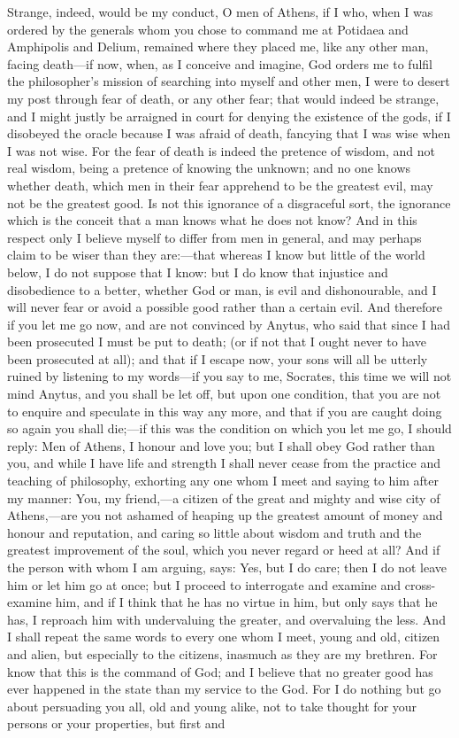 \documentclass[11pt,letter]{article}
\begin{document}
\par  Strange, indeed, would be my conduct, O men of Athens, if I who, when I was ordered by the generals whom you chose to command me at Potidaea and Amphipolis and Delium, remained where they placed me, like any other man, facing death—if now, when, as I conceive and imagine, God orders me to fulfil the philosopher’s mission of searching into myself and other men, I were to desert my post through fear of death, or any other fear; that would indeed be strange, and I might justly be arraigned in court for denying the existence of the gods, if I disobeyed the oracle because I was afraid of death, fancying that I was wise when I was not wise. For the fear of death is indeed the pretence of wisdom, and not real wisdom, being a pretence of knowing the unknown; and no one knows whether death, which men in their fear apprehend to be the greatest evil, may not be the greatest good. Is not this ignorance of a disgraceful sort, the ignorance which is the conceit that a man knows what he does not know? And in this respect only I believe myself to differ from men in general, and may perhaps claim to be wiser than they are:—that whereas I know but little of the world below, I do not suppose that I know: but I do know that injustice and disobedience to a better, whether God or man, is evil and dishonourable, and I will never fear or avoid a possible good rather than a certain evil. And therefore if you let me go now, and are not convinced by Anytus, who said that since I had been prosecuted I must be put to death; (or if not that I ought never to have been prosecuted at all); and that if I escape now, your sons will all be utterly ruined by listening to my words—if you say to me, Socrates, this time we will not mind Anytus, and you shall be let off, but upon one condition, that you are not to enquire and speculate in this way any more, and that if you are caught doing so again you shall die;—if this was the condition on which you let me go, I should reply: Men of Athens, I honour and love you; but I shall obey God rather than you, and while I have life and strength I shall never cease from the practice and teaching of philosophy, exhorting any one whom I meet and saying to him after my manner: You, my friend,—a citizen of the great and mighty and wise city of Athens,—are you not ashamed of heaping up the greatest amount of money and honour and reputation, and caring so little about wisdom and truth and the greatest improvement of the soul, which you never regard or heed at all? And if the person with whom I am arguing, says: Yes, but I do care; then I do not leave him or let him go at once; but I proceed to interrogate and examine and cross-examine him, and if I think that he has no virtue in him, but only says that he has, I reproach him with undervaluing the greater, and overvaluing the less. And I shall repeat the same words to every one whom I meet, young and old, citizen and alien, but especially to the citizens, inasmuch as they are my brethren. For know that this is the command of God; and I believe that no greater good has ever happened in the state than my service to the God. For I do nothing but go about persuading you all, old and young alike, not to take thought for your persons or your properties, but first and 
\end{document}
